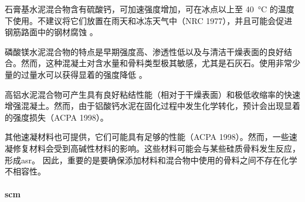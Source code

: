 石膏基水泥混合物含有硫酸钙，可加速强度增加，可在冰点以上至 \qty{40}{\celsius} 的温度下使用。不建议将它们放置在雨天和冰冻天气中（NRC 1977），并且可能会促进钢筋路面中的钢材腐蚀 \cite{mojab1993i}。

磷酸镁水泥混合物的特点是早期强度高、渗透性低以及与清洁干燥表面的良好结合。然而，这种混凝土对含水量和骨料类型极其敏感，尤其是石灰石。使用非常少量的过量水可以获得显着的强度降低 \cite{mojab1993i}。

高铝水泥混合物可产生具有良好粘结性能（相对于干燥表面）和极低收缩率的快速增强混凝土。然而，由于铝酸钙水泥在固化过程中发生化学转化，预计会出现显着的强度损失（ACPA 1998）。

其他速凝材料也可提供，它们可能具有足够的性能（ACPA 1998）。然而，一些速凝修复材料会受到高碱性材料的影响。这些材料可能会与某些硅质骨料发生反应，形成\acrfull*{asr}。 因此，重要的是要确保添加材料和混合物中使用的骨料之间不存在化学不相容性。

\paragraph{\acrfull*{scm}}


